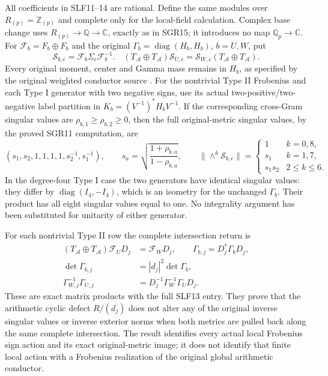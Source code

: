 All coefficients in SLF11--14 are rational. Define the same modules
over $R_{(p)}=\mathbb Z_{(p)}$ and complete only for the local-field
calculation. Complex base change uses $R_{(p)}\to\mathbb Q\to\mathbb C$,
exactly as in SGR15; it introduces no map $\mathbb Q_p\to\mathbb C$.
For $\mathcal F_b=F_b\oplus F_b$ and the original
$\Gamma_b=\operatorname{diag}(H_b,H_b)$, $b=U,W$, put
\[
 \mathscr S_{b,\epsilon}=\mathcal F_b\Sigma_\epsilon\mathcal F_b^{-1}.
 \quad
 (T_{\mathcal A}\oplus T_{\mathcal A})\mathscr S_{U,\epsilon}
 =\mathscr S_{W,\epsilon}(T_{\mathcal A}\oplus T_{\mathcal A}).
                                                               \tag{SLF15}
\]
Every original moment, center and Gamma mass remains in $H_b$,
as specified by the original weighted conductor source \cite{WCF}.
For the nontrivial Type II Frobenius and each Type I generator with
two negative signs, use its actual two-positive/two-negative label
partition in $K_b=(V^{-1})^*H_bV^{-1}$.
If the corresponding cross-Gram singular values are
$\rho_{b,1}\ge\rho_{b,2}\ge0$, then the full original-metric
singular values, by the proved SGR11 computation, are
\[
 (s_1,s_2,1,1,1,1,s_2^{-1},s_1^{-1}),\qquad
 s_a=\sqrt{\frac{1+\rho_{b,a}}{1-\rho_{b,a}}},\qquad
 \|\wedge^k\mathscr S_{b,\epsilon}\|=
 \begin{cases}
 1&k=0,8,\\s_1&k=1,7,\\s_1s_2&2\le k\le6.
 \end{cases}                                                   \tag{SLF16}
\]
In the degree-four Type I case the two generators have identical
singular values: they differ by $\operatorname{diag}(I_4,-I_4)$,
which is an isometry for the unchanged $\Gamma_b$. Their product
has all eight singular values equal to one. No integrality argument
has been substituted for unitarity of either generator.

For each nontrivial Type II row the complete intersection return is
\[
\begin{aligned}
 (T_{\mathcal A}\oplus T_{\mathcal A})\mathcal F_UD_j
   &=\mathcal F_WD_j,\qquad \Gamma_{b,j}=D_j^*\Gamma_bD_j,\\
 \det\Gamma_{b,j}&=|d_j|^2\det\Gamma_b,\\
 \Gamma_{W,j}^{-1}\Gamma_{U,j}
   &=D_j^{-1}\Gamma_W^{-1}\Gamma_UD_j.
\end{aligned}                                                   \tag{SLF17}
\]
These are exact matrix products with the full SLF13 entry.
They prove that the arithmetic cyclic defect $R/(d_j)$ does not
alter any of the original inverse singular values or inverse
exterior norms when both metrics are pulled back along the same
complete intersection. The result identifies every actual local
Frobenius sign action and its exact original-metric image; it does
not identify that finite local action with a Frobenius realization
of the original global arithmetic conductor.
